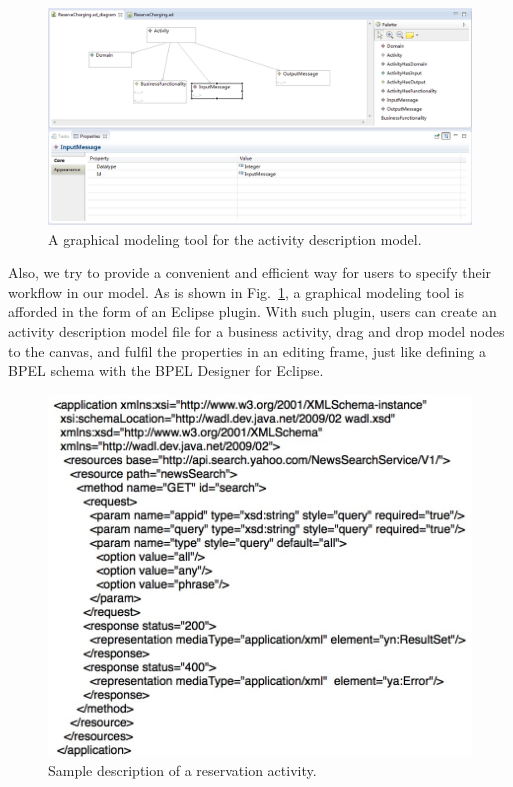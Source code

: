 \begin{figure}[!t]
\centering
\includegraphics[width=1.0\linewidth]{./graph/eclipseplugin}
\caption{A graphical modeling tool for the activity description model.}
\label{fig_eclipseplugin}
\end{figure}

Also, we try to provide a convenient and efficient way for users to specify their workflow in our model. As is shown in Fig.~\ref{fig_eclipseplugin}, a graphical modeling tool is afforded in the form of an Eclipse plugin. With such plugin, users can create an activity description model file for a business activity, drag and drop model nodes to the canvas, and fulfil the properties in an editing frame, just like defining a BPEL schema with the BPEL Designer for Eclipse. 

\begin{figure}[!t]
\centering
\includegraphics[width=1.0\linewidth]{./graph/wadl}
\caption{Sample description of a reservation activity.}
\label{fig_wadl}
\end{figure}

